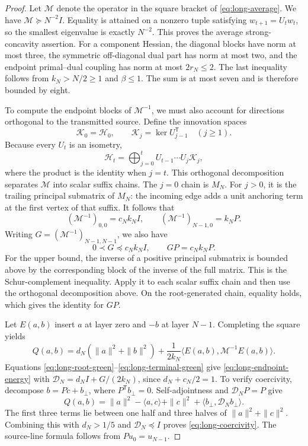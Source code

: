 \documentclass[11pt,letterpaper]{article}
\theoremstyle{definition}
\theoremstyle{remark}
\begin{document}
\begin{proof}
Let $\mathcal M$ denote the operator in the square bracket of
\eqref{eq:long-average}.  We have $\mathcal M\succeq N^{-2}I$.
Equality is attained on a nonzero tuple satisfying
$w_{t+1}=U_tw_t$, so the smallest eigenvalue is exactly $N^{-2}$.
This proves the average strong-concavity assertion.
For a component Hessian, the diagonal blocks have norm at most three,
the symmetric off-diagonal dual part has norm at most two, and the
endpoint primal--dual coupling has norm at most $2r_N\le2$.
The last inequality follows from $k_N>N/2\ge1$ and $\beta\le1$.
The sum is at most seven and is therefore bounded by eight.

To compute the endpoint blocks of $\mathcal M^{-1}$, we must also account
for directions orthogonal to the transmitted source.  Define the
innovation spaces
\[
 \mathcal K_0=\mathcal H_0,
 \qquad \mathcal K_j=\ker U_{j-1}^{\mathsf T}\quad(j\ge1).
\]
Because every $U_t$ is an isometry,
\[
 \mathcal H_t
 =\bigoplus_{j=0}^t U_{t-1}\cdots U_j\mathcal K_j,
\]
where the product is the identity when $j=t$.
This orthogonal decomposition separates $\mathcal M$ into scalar suffix
chains.  The $j=0$ chain is $M_N$.  For $j>0$, it is the trailing
principal submatrix of $M_N$: the incoming edge adds a unit anchoring term
at the first vertex of that suffix.  It follows that
\begin{equation}
 (\mathcal M^{-1})_{0,0}=c_Nk_NI,
 \qquad
 (\mathcal M^{-1})_{N-1,0}=k_NP.
 \label{eq:long-root-green}
\end{equation}
Writing $G=(\mathcal M^{-1})_{N-1,N-1}$, we also have
\begin{equation}
 0\prec G\preceq c_Nk_NI,
 \qquad GP=c_Nk_NP.
 \label{eq:long-terminal-green}
\end{equation}
For the upper bound, the inverse of a positive principal submatrix is
bounded above by the corresponding block of the inverse of the full
matrix.  This is the Schur-complement inequality.  Apply it to each
scalar suffix chain and then use the orthogonal decomposition above.
On the root-generated chain, equality holds, which gives the identity
for $GP$.

Let $E(a,b)$ insert $a$ at layer zero and $-b$ at layer $N-1$.
Completing the square yields
\[
 Q(a,b)=d_N(\|a\|^2+\|b\|^2)
       +\frac1{2k_N}
        \langle E(a,b),\mathcal M^{-1}E(a,b)\rangle.
\]
Equations \eqref{eq:long-root-green}--\eqref{eq:long-terminal-green}
give \eqref{eq:long-endpoint-energy} with
$\mathcal D_N=d_NI+G/(2k_N)$, since $d_N+c_N/2=1$.
To verify coercivity, decompose $b=Pc+b_\perp$, where
$P^{\mathsf T}b_\perp=0$.  Self-adjointness and
$\mathcal D_NP=P$ give
\[
 Q(a,b)=\|a\|^2-\langle a,c\rangle+\|c\|^2
          +\langle b_\perp,\mathcal D_Nb_\perp\rangle.
\]
The first three terms lie between one half and three halves of
$\|a\|^2+\|c\|^2$.  Combining this with
$d_N>1/5$ and $\mathcal D_N\preceq I$ proves
\eqref{eq:long-coercivity}.  The source-line formula follows from
$Pu_0=u_{N-1}$.


\end{proof}
\end{document}

